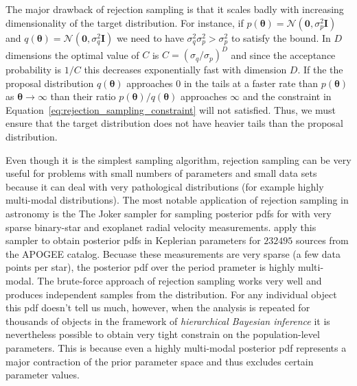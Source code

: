 \documentclass[12pt,dvipsnames]{report}
\newcommand{\ssf}[1]{\textsf{#1}}
\renewcommand{\vec}[1]{\boldsymbol{\mathbf{#1}}}
\begin{document}
The major drawback of rejection sampling is that it scales badly with
increasing dimensionality of the target distribution. For instance, if
$p(\vec{\theta})=\mathcal{N}(\vec{0}, \sigma_p^2\vec{I})$ and
$q(\vec{\theta})=\mathcal{N}(\vec{0}, \sigma_q^2\vec{I})$ we need to have
$\sigma_q^2\sigma_p^2>\sigma_p^2$ to satisfy the bound. In $D$ dimensions the
optimal value of $C$ is $C=(\sigma_q/\sigma_p)^D$ and since the acceptance
probability is $1/C$ this decreases exponentially fast with dimension $D$. If
the the proposal distribution $q(\vec{\theta})$ approaches $0$ in the tails at
a faster rate than $p(\vec{\theta})$ as $\vec{\theta}\rightarrow \infty$ than
their ratio $p(\vec{\theta})/q(\vec{\theta})$ approaches $\infty$ and the
constraint in Equation~\ref{eq:rejection_sampling_constraint} will not
satisfied. Thus, we must ensure that the target distribution does not have
heavier tails than the proposal distribution.

Even though it is the simplest sampling algorithm, rejection sampling can be
very useful for problems with small numbers of parameters and small data sets
because it can deal with very pathological distributions (for example highly
multi-modal distributions). The most notable application of rejection sampling
in astronomy is the \ssf{The Joker} sampler \citep{2017ApJ...837...20P} for
sampling posterior pdfs for with very sparse binary-star and exoplanet radial
velocity measurements. \citet{2020ApJ...895....2P} apply this sampler to obtain
posterior pdfs in Keplerian parameters for $232 495$ sources from the APOGEE
catalog. Becuase these measurements are very sparse (a few data points per
star), the posterior pdf over the period prameter is highly multi-modal. The
brute-force approach of rejection sampling works very well and produces
independent samples from the distribution. For any individual object this pdf
doesn't tell us much, however, when the analysis is repeated for thousands of
objects in the framework of \textsl{hierarchical Bayesian inference} it is
nevertheless possible to obtain very tight constrain on the population-level
parameters. This is because even a highly multi-modal posterior pdf represents
a major contraction of the prior parameter space and thus excludes certain
parameter values.
\end{document}
